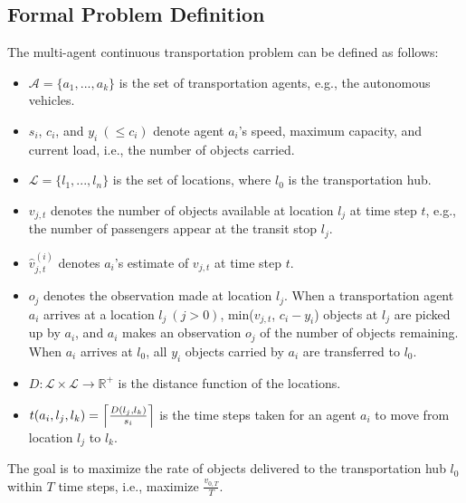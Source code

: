 \documentclass{aamas2016_extendedabstract}
\DeclarePairedDelimiter\ceil{\lceil}{\rceil}
\begin{document}
\subsection{Formal Problem Definition}
The multi-agent continuous transportation problem can be defined as follows:
\begin{itemize}
\itemsep0em
\item $\mathcal{A}=\{a_1,...,a_{k}\}$ is the set of transportation agents, e.g., the autonomous vehicles.
\item $s_i$, $c_i$, and $y_i\ (\leq c_i)$ denote agent $a_i$'s speed, maximum capacity, and current load, i.e., the number of objects carried.
\item $\mathcal{L}=\{l_1,...,l_{n}\}$ is the set of locations, where $l_0$ is the transportation hub.
\item $v_{j,t}$ denotes the number of objects available at location $l_j$ at time step $t$, e.g.,
the number of passengers appear at the transit stop $l_j$.
\item $\hat{v}_{j,t}^{(i)}$ denotes $a_i$'s estimate of $v_{j,t}$ at time step $t$.
\item $o_j$ denotes the observation made at location $l_j$. When a transportation agent $a_i$ arrives at a location $l_j\ (j > 0)$,
min($v_{j,t}$, $c_i-y_i$) objects at $l_j$ are picked up by $a_i$,
and $a_i$ makes an observation $o_j$ of the number of objects
remaining. When $a_i$ arrives at $l_0$, all $y_i$ objects carried by $a_i$ are transferred to $l_0$.
\item $D:\mathcal{L}\times\mathcal{L}\rightarrow\mathbb{R}^+$ is the distance function of the locations.
\item $t(a_i,l_j,l_k)=\ceil*{\frac{D(l_j,l_k)}{s_i}}$ is the time steps taken for an agent $a_i$ to move from location $l_j$ to $l_k$. 
\end{itemize}

The goal is to maximize the rate of objects delivered to the transportation hub $l_0$ within
$T$ time steps, i.e., maximize $\frac{v_{0,T}}{T}$.
\end{document}
